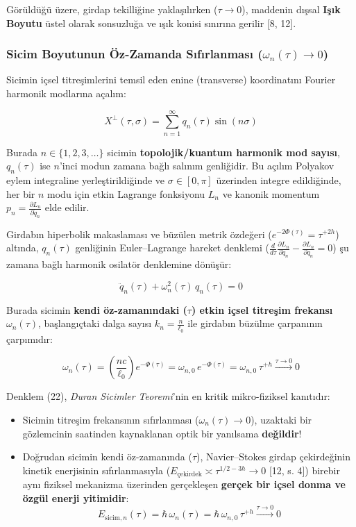 \documentclass[12pt,a4paper]{article}
\begin{document}
Görüldüğü üzere, girdap tekilliğine yaklaşılırken ($\tau \to 0$), maddenin dışsal \textbf{Işık Boyutu} üstel olarak sonsuzluğa ve ışık konisi sınırına gerilir [8, 12].

\subsubsection{Sicim Boyutunun Öz-Zamanda Sıfırlanması ($\omega_n(\tau) \to 0$)}
Sicimin içsel titreşimlerini temsil eden enine (transverse) koordinatını Fourier harmonik modlarına açalım:

\begin{equation}
X^\perp(\tau, \sigma) = \sum_{n=1}^{\infty} q_n(\tau) \sin(n \sigma)
\end{equation}

Burada $n \in \{1, 2, 3, \dots\}$ sicimin \textbf{topolojik/kuantum harmonik mod sayısı}, $q_n(\tau)$ ise $n$'inci modun zamana bağlı salınım genliğidir. Bu açılım Polyakov eylem integraline yerleştirildiğinde ve $\sigma \in [0, \pi]$ üzerinden integre edildiğinde, her bir $n$ modu için etkin Lagrange fonksiyonu $L_n$ ve kanonik momentum $p_n = \frac{\partial L_n}{\partial \dot{q}_n}$ elde edilir. 

Girdabın hiperbolik makaslaması ve büzülen metrik özdeğeri ($e^{-2\Phi(\tau)} = \tau^{+2h}$) altında, $q_n(\tau)$ genliğinin Euler--Lagrange hareket denklemi ($\frac{d}{d\tau}\frac{\partial L_n}{\partial \dot{q}_n} - \frac{\partial L_n}{\partial q_n} = 0$) şu zamana bağlı harmonik osilatör denklemine dönüşür:

\begin{equation}
\ddot{q}_n(\tau) + \omega_n^2(\tau) \, q_n(\tau) = 0
\end{equation}

Burada sicimin \textbf{kendi öz-zamanındaki ($\tau$) etkin içsel titreşim frekansı $\omega_n(\tau)$}, başlangıçtaki dalga sayısı $k_n = \frac{n}{\ell_0}$ ile girdabın büzülme çarpanının çarpımıdır:

\begin{equation}
\omega_n(\tau) = \left( \frac{n c}{\ell_0} \right) e^{-\Phi(\tau)} = \omega_{n,0} \, e^{-\Phi(\tau)} = \omega_{n,0} \, \tau^{+h} \xrightarrow{\tau \to 0} 0
\end{equation}

Denklem (22), \textit{Duran Sicimler Teoremi}'nin en kritik mikro-fiziksel kanıtıdır:
\begin{itemize}
    \item Sicimin titreşim frekansının sıfırlanması ($\omega_n(\tau) \to 0$), uzaktaki bir gözlemcinin saatinden kaynaklanan optik bir yanılsama \textbf{değildir}!
    \item Doğrudan sicimin kendi öz-zamanında ($\tau$), Navier--Stokes girdap çekirdeğinin kinetik enerjisinin sıfırlanmasıyla ($E_{\text{çekirdek}} \asymp \tau^{1/2-3h} \to 0$ [12, s. 4]) birebir aynı fiziksel mekanizma üzerinden gerçekleşen \textbf{gerçek bir içsel donma ve özgül enerji yitimidir}:
    \begin{equation}
    E_{\text{sicim}, n}(\tau) = \hbar \, \omega_n(\tau) = \hbar \, \omega_{n,0} \, \tau^{+h} \xrightarrow{\tau \to 0} 0
    \end{equation}
\end{itemize}
\end{document}
